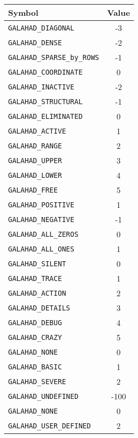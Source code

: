 \documentclass{galahad}
\begin{document}
\begin{figure}[htbp]
\begin{center}
\begin{tabular}{|l|c|}
\hline
Symbol                             & Value \\
\hline
{\tt GALAHAD\_DIAGONAL}            & -3 \\
{\tt GALAHAD\_DENSE}               & -2 \\
{\tt GALAHAD\_SPARSE\_by\_ROWS}    & -1 \\
{\tt GALAHAD\_COORDINATE}          &  0 \\
\hline
{\tt GALAHAD\_INACTIVE}            & -2 \\
{\tt GALAHAD\_STRUCTURAL}          & -1 \\
{\tt GALAHAD\_ELIMINATED}          &  0 \\
{\tt GALAHAD\_ACTIVE}              &  1 \\
{\tt GALAHAD\_RANGE}               &  2 \\
{\tt GALAHAD\_UPPER}               &  3 \\
{\tt GALAHAD\_LOWER}               &  4 \\
{\tt GALAHAD\_FREE}                &  5 \\
\hline
{\tt GALAHAD\_POSITIVE}            &  1 \\
{\tt GALAHAD\_NEGATIVE}            & -1 \\
\hline
{\tt GALAHAD\_ALL\_ZEROS}          &  0 \\
{\tt GALAHAD\_ALL\_ONES}           &  1 \\
\hline
{\tt GALAHAD\_SILENT}               &  0 \\
{\tt GALAHAD\_TRACE}                &  1 \\
{\tt GALAHAD\_ACTION}               &  2 \\
{\tt GALAHAD\_DETAILS}              &  3 \\
{\tt GALAHAD\_DEBUG}                &  4 \\
{\tt GALAHAD\_CRAZY}                &  5 \\
\hline
{\tt GALAHAD\_NONE}                 &  0 \\
{\tt GALAHAD\_BASIC}                &  1 \\
{\tt GALAHAD\_SEVERE}               &  2 \\
\hline
{\tt GALAHAD\_UNDEFINED}            & -100 \\
{\tt GALAHAD\_NONE}                 &  0 \\
{\tt GALAHAD\_USER\_DEFINED}        &  2 \\

\end{tabular}
\end{center}
\end{figure}
\end{document}
